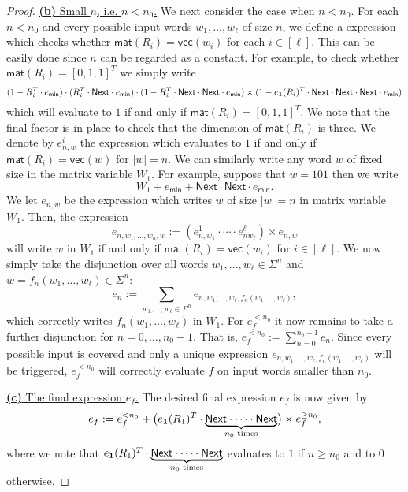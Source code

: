 \begin{proof}
\medskip
\noindent
\underline{\textbf{(b)} Small $n$, i.e. $n< n_0$.}	
We next consider the case when $n<n_0$. For each $n<n_0$ and every possible input words
    $w_1,\ldots,w_\ell$ of size $n$, we define a \langfor expression which checks whether
    $\mathsf{mat}(R_i)=\mathsf{vec}(w_i)$ for each $i\in[\ell]$. This can be easily done since $n$ 
    can be regarded as a constant. For example, to check whether $\mathsf{mat}(R_i)=[0,1,1]^T$ we simply write
    $$
    (1- R_i^T\cdot e_{\mathsf{min}})\cdot (R_i^T\cdot \mathsf{Next}\cdot e_{\mathsf{min}})\cdot (1- R_i^T\cdot \mathsf{Next}\cdot \mathsf{Next}\cdot e_{\mathsf{min}})\times (1- e_{\mathbf{1}}(R_i)^T\cdot \mathsf{Next}\cdot \mathsf{Next}\cdot \mathsf{Next}\cdot e_{\mathsf{min}})
    $$
    which will evaluate to $1$ if and only if $\mathsf{mat}(R_i)=[0,1,1]^T$. We note that the final factor is in 
    place to check that the dimension of $\mathsf{mat}(R_i)$ is three.
    We denote by
    $e_{n,w}^i$ the expression which evaluates to $1$ if and only if $\mathsf{mat}(R_i)=\mathsf{vec}(w)$
    for $|w|=n$.
    We can similarly
    write any word $w$ of fixed size in the matrix variable $W_1$. For example, suppose that $w=101$
    then we write 
    $$
    W_1+ e_{\mathsf{min}}+  \mathsf{Next}\cdot \mathsf{Next}\cdot e_{\mathsf{min}}.
    $$
    We let $e_{n,w}$ be the expression which writes $w$ of size $|w|=n$ in matrix variable $W_1$.
    Then, the expression
    $$
    e_{n,w_1,\ldots,w_n,w}:=(e_{n,w_1}^1\cdot\cdots\cdot e_{nw_{\ell}}^\ell)\times e_{n,w}
    $$
    will write $w$ in $W_1$ if and only if $\mathsf{mat}(R_i)=\mathsf{vec}(w_i)$ for $i\in[\ell]$.
    We now simply take the disjunction over all words 
    $w_1,\ldots,w_\ell\in\Sigma^n$ and $w=f_n(w_1,\ldots,w_\ell)\in\Sigma^n$:
    $$
    e_n:=\sum_{w_1,\ldots,w_\ell\in\Sigma^n} e_{n,w_1,\ldots,w_\ell,f_n(w_1,\ldots,w_\ell)},
    $$
    which correctly writes $f_n(w_1,\ldots,w_\ell)$ in $W_1$. For $e_f^{<n_0}$ it now remains
to take a further disjunction for $n=0,\ldots, n_0-1$. That is,
    $
    e_f^{<n_0}:=\sum_{n=0}^{n_0-1} e_n
    $.
    Since every possible input is covered and only a unique expression 
    $e_{n,w_1,\ldots,w_\ell,f_n(w_1,\ldots,w_\ell)}$ will be triggered, $e_f^{<n_0}$ will correctly
    evaluate $f$ on input words smaller than $n_0$.

\medskip
\noindent
\underline{\textbf{(c)} The final expression $e_f$.}	
 The desired final expression $e_f$ is now given by
    $$
    e_f:=e_f^{<n_0} + \bigl(e_{\mathbf{1}}(R_1)^T\cdot\underbrace{\mathsf{Next}\cdot\cdots\cdot \mathsf{Next}}_{\text{$n_0$ times}}\bigr)\times e_f^{\geq n_0},
    $$
where we note that $e_{\mathbf{1}}(R_1)^T\cdot\underbrace{\mathsf{Next}\cdot\cdots\cdot \mathsf{Next}}_{\text{$n_0$ times}}$ evaluates to $1$ if
$n\geq n_0$ and to $0$ otherwise.
\end{proof}

